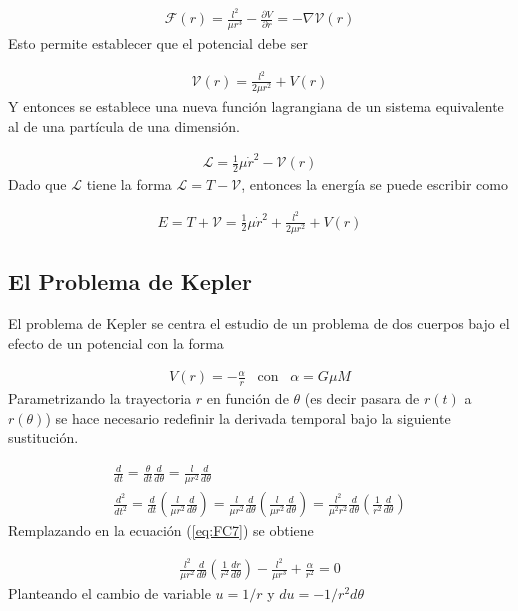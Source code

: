\begin{gather*}
    \mathcal{F}(r) = \frac{l^2}{\mu r^3} - \frac{\partial V}{\partial r} = - \nabla \mathcal{V}(r)
\end{gather*}
Esto permite establecer que el potencial debe ser 

\begin{gather}
    \mathcal{V}(r) = \frac{l^2}{2\mu r^2} + V(r)
\end{gather}
Y entonces se establece una nueva función lagrangiana de un sistema equivalente al de una partícula de una dimensión.

\begin{gather*}
    \mathcal{L} = \frac{1}{2}\mu\dot{r}^2 - \mathcal{V}(r)
\end{gather*}
Dado que $\mathcal{L}$ tiene la forma $\mathcal{L} = T - \mathcal{V}$, entonces la energía se puede escribir como 

\begin{gather*}
    E = T + \mathcal{V} = \frac{1}{2}\mu\dot{r}^2 + \frac{l^2}{2\mu r^2} + V(r)
\end{gather*}

\subsection{El Problema de Kepler}

El problema de Kepler se centra el estudio de un problema de dos cuerpos bajo el efecto de un potencial con la forma 

\begin{gather}
    V(r) = -\frac{\alpha}{r} \;\;\; \text{con} \;\;\; \alpha = G\mu M
\end{gather}
Parametrizando la trayectoria $r$ en función de $\theta$ (es decir pasara de $r(t)$ a $r(\theta)$) se hace necesario redefinir la derivada temporal bajo la siguiente sustitución.

\begin{gather}
    \frac{d}{dt} = \frac{\theta}{dt}\frac{d}{d \theta} = \frac{l}{\mu r^2}\frac{d}{d \theta}\\
    \frac{d^2}{dt^2} = \frac{d}{dt}\left(\frac{l}{\mu r^2}\frac{d}{d \theta}\right) = \frac{l}{\mu r^2}\frac{d}{d \theta}\left(\frac{l}{\mu r^2}\frac{d}{d \theta}\right) = \frac{l^2}{\mu^2 r^2}\frac{d}{d\theta}\left(\frac{1}{r^2}\frac{d}{d \theta}\right)
\end{gather}
Remplazando en la ecuación (\ref*{eq:FC7}) se obtiene

\begin{gather*}
    \frac{l^2}{\mu r^2}\frac{d}{d\theta}\left(\frac{1}{r^2}\frac{dr}{d \theta}\right) - \frac{l^2}{\mu r^3} + \frac{\alpha}{r^2} = 0
\end{gather*}
Planteando el cambio de variable $u = 1/r$ y $du = -1/r^2 d\theta$

